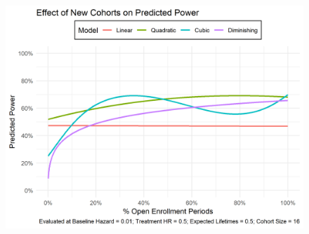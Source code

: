 \begin{figure}
\caption[Effect of New Cohorts on Power]{}
\label{fig:power-pct-open-enrollment}
\includegraphics[width=\textwidth]{reports/figures/single-effects/power-pct-open-enrollment.png}
\end{figure}
